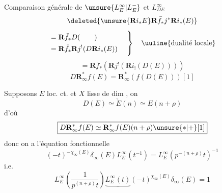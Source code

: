 Comparaison générale de $\unsure{L_E^\infty|L_E^-}$ et $L_{DE}^\infty$
\[\deleted{\unsure{\mathbf R i_*E}\mathbf R\bar f_*j^*\mathbf R i_*(E)}\]
\[
\begin{aligned}
&=\mathbf R\bar f_*D(\qquad)\\
&=\mathbf R\bar f_*\mathbf R j^!(D\mathbf R i_*(E))
\end{aligned}
\quad\left.\vphantom{\begin{matrix}1\\1\\1\end{matrix}}\right\}\quad\text{\uuline{dualité locale}}
\]
\[=\mathbf R\bar f_*\left(\mathbf R j^!\left(\mathbf R i_!(D(E))\right)\right)\]
\[\boxed{D\mathbf R_\infty^*f(E)=\mathbf R_\infty^*(f(D(E)))[1]}\]

Supposons $E$ loc. ct.  et $X$ lisse de dim  , on 
\[D(E)\simeq\check E(n)\simeq E(n+\rho)\]
d'où
\[\boxed{D\mathbf R_\infty^*f(E)\simeq\mathbf R_\infty^*f(E)(n+\rho)\unsure{*|+}[1]}\]
donc on a l'équation fonctionnelle
\[(-t)^{-\chi_\infty(E)}\delta_\infty(E)L_E^\infty(t^{-1})=L_E^\infty\left(p^{-(n+\rho)}t\right)^{-1}\]
i.e.
\[\boxed{L_E^\infty\left(\frac1{p^{(n+\rho)}t}\right)\underbrace{L_E^\infty(t)}(-t)^{\chi_\infty(E)}\delta_\infty(E)=1}\]

